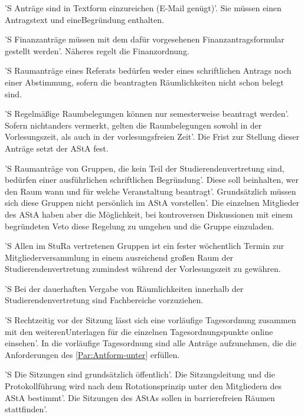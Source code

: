 \documentclass[fontsize=12pt,parskip=half, ref=short]{scrartcl}
\begin{document}
\begin{contract}
  \label{Par:Antform-unter}
  'S Anträge sind in Textform einzureichen (E-Mail genügt)'. Sie müssen einen
  Antragstext und eineBegründung enthalten.

  'S Finanzanträge müssen mit dem dafür vorgesehenen Finanzantragsformular
  gestellt werden'. Näheres regelt die Finanzordnung.

  'S Raumanträge eines Referats bedürfen weder eines schriftlichen Antrags noch
  einer Abstimmung, sofern die beantragten Räumlichkeiten nicht schon belegt
  sind.

  'S Regelmäßige Raumbelegungen können nur  semesterweise beantragt werden'.
  Sofern nichtanders vermerkt, gelten die Raumbelegungen sowohl in der
  Vorlesungszeit, als auch in der vorlesungsfreien Zeit'. Die Frist zur Stellung
  dieser Anträge setzt der AStA fest.

  'S Raumanträge von Gruppen, die kein Teil der Studierendenvertretung sind,
  bedürfen einer ausführlichen schriftlichen Begründung'. Diese soll beinhalten,
  wer den Raum wann und für welche Veranstaltung beantragt'. Grundsätzlich
  müssen sich diese Gruppen nicht persönlich im AStA vorstellen'. Die einzelnen
  Mitglieder des AStA haben aber die Möglichkeit, bei kontroversen Diskussionen
  mit einem begründeten Veto diese Regelung zu umgehen und die Gruppe
  einzuladen.

  'S Allen im StuRa vertretenen Gruppen ist ein fester wöchentlich Termin zur
  Mitgliederversammlung in einem ausreichend großen Raum der
  Studierendenvertretung zumindest während der Vorlesungszeit zu gewähren.

  'S Bei der dauerhaften Vergabe von Räumlichkeiten innerhalb der
  Studierendenvertretung sind Fachbereiche vorzuziehen.

  \label{Par:Vorl-TO}
  'S Rechtzeitig vor der Sitzung lässt sich eine vorläufige Tagesordnung
  zusammen mit den weiterenUnterlagen für die einzelnen Tagesordnungspunkte
  online einsehen'. In die vorläufige Tagesordnung sind alle Anträge
  aufzunehmen, die die Anforderungen des \ref{Par:Antform-unter} erfüllen.

  \label{Par:Sitz}
  'S Die Sitzungen sind grundsätzlich öffentlich'. Die Sitzungsleitung und die
  Protokollführung wird nach dem Rotationsprinzip unter den Mitgliedern des AStA
  bestimmt'. Die Sitzungen des AStAs sollen in barrierefreien Räumen
  stattfinden'.


\end{contract}
\end{document}
